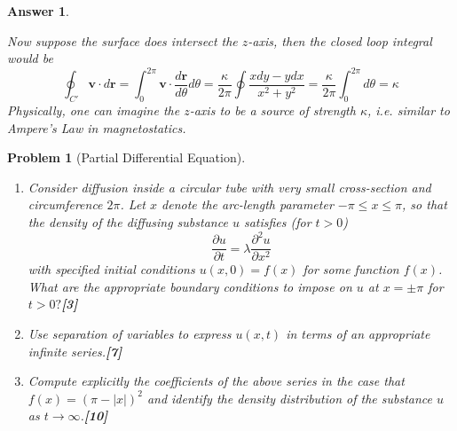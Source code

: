 \documentclass[a4paper]{article}
\newtheorem{ans}{Answer}[section]
\theoremstyle{new}
\newtheorem{qns}{Problem}[section]
\begin{document}
\begin{ans}
\begin{enumerate}[label=(\alph*)]
\begin{enumerate}[label=(\roman*)]
\begin{center}
  \end{center}
Now suppose the surface does intersect the $z$-axis, then the closed loop integral would be
$$\oint_{C'}\mathbf{v}\cdot d\mathbf{r}=\int_0^{2\pi}\mathbf{v}\cdot\frac{d\mathbf{r}}{d\theta} d\theta=\frac{\kappa}{2\pi}\oint\frac{xdy-ydx}{x^2+y^2}=\frac{\kappa}{2\pi}\int_0^{2\pi} d\theta=\kappa$$
Physically, one can imagine the $z$-axis to be a source of strength $\kappa$, i.e. similar to Ampere's Law in magnetostatics.
\end{enumerate}
\end{enumerate}
\end{ans}
\newpage
\begin{qns}[Partial Differential Equation]\leavevmode
\begin{enumerate}[label=(\alph*)]
    \item Consider diffusion inside a circular tube with very small cross-section and circumference $2\pi$. Let $x$ denote the arc-length parameter $-\pi\leq x\leq\pi$, so that the density of the diffusing substance $u$ satisfies (for $t>0$)
$$\frac{\partial u}{\partial t}=\lambda\frac{\partial^2u}{\partial x^2}$$
with specified initial conditions $u(x,0)=f(x)$ for some function $f(x)$. What are the appropriate boundary conditions to impose on $u$ at $x=\pm\pi$ for $t>0?$\hfill \textbf{[3]}
\item Use separation of variables to express $u(x,t)$ in terms of an appropriate infinite series.\hfill \textbf{[7]}
\item Compute explicitly the coefficients of the above series in the case that $f(x)=(\pi-|x|)^2$ and identify the density distribution of the substance $u$ as $t\rightarrow\infty$.\hfill \textbf{[10]}
\end{enumerate}
\end{qns}
\end{document}
